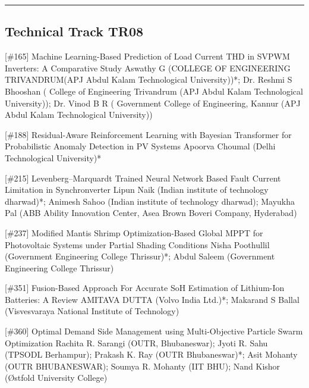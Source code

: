 \hrule  \subsection{Technical Track TR08}\nopagebreak {} \begin{abstract_online} {[\#165] Machine Learning-Based Prediction of Load Current THD in SVPWM Inverters: A Comparative Study} {} {Aswathy G (COLLEGE OF ENGINEERING TRIVANDRUM(APJ Abdul Kalam Technological University))*; Dr. Reshmi  S Bhooshan ( College of Engineering Trivandrum (APJ Abdul Kalam Technological University)); Dr. Vinod  B R ( Government College of Engineering, Kannur (APJ Abdul Kalam Technological University))} {}  \end{abstract_online} 
{} \begin{abstract_online} {[\#188] Residual-Aware Reinforcement Learning with Bayesian Transformer for Probabilistic Anomaly Detection in PV Systems} {} {Apoorva Choumal (Delhi Technological University)*} {}  \end{abstract_online} 
{} \begin{abstract_online} {[\#215] Levenberg--Marquardt Trained Neural Network Based Fault Current Limitation in Synchronverter} {} {Lipun Naik (Indian institute of technology dharwad)*; Animesh Sahoo (Indian institute of technology dharwad); Mayukha Pal (ABB Ability Innovation Center, Asea Brown Boveri Company, Hyderabad)} {}  \end{abstract_online} 
{} \begin{abstract_online} {[\#237] Modified Mantis Shrimp Optimization-Based Global  MPPT for Photovoltaic Systems under Partial  Shading Conditions} {} {Nisha Poothullil (Government Engineering College Thrissur)*; Abdul Saleem (Government Engineering College Thrissur)} {}  \end{abstract_online} 
{} \begin{abstract_online} {[\#351] Fusion-Based Approach For Accurate SoH Estimation of Lithium-Ion Batteries: A Review} {} {AMITAVA DUTTA (Volvo India Ltd.)*; Makarand S Ballal (Visvesvaraya National Institute of Technology)} {}  \end{abstract_online} 
{} \begin{abstract_online} {[\#360] Optimal Demand Side Management using Multi-Objective Particle Swarm Optimization} {} {Rachita R. Sarangi (OUTR, Bhubaneswar); Jyoti R. Sahu (TPSODL Berhampur); Prakash K. Ray (OUTR Bhubaneswar)*; Asit Mohanty (OUTR BHUBANESWAR); Soumya R. Mohanty (IIT BHU); Nand Kishor (Østfold University College)} {}  \end{abstract_online} 
